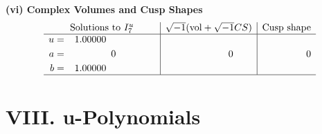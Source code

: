 \documentclass[1p]{elsarticle_modified}
\theoremstyle{definition}
\newcommand{\I}{\sqrt{-1}}
\begin{document}
\newpage\flushleft \textbf{(vi) Complex Volumes and Cusp Shapes}
$$\begin{array}{c|c|c}  
\text{Solutions to }I^u_{7}& \I (\text{vol} + \sqrt{-1}CS) & \text{Cusp shape}\\
 \hline 
\begin{aligned}
u &= \phantom{-}1.00000\phantom{ +0.000000I} \\
a &= \phantom{-0.000000 } 0 \\
b &= \phantom{-}1.00000\phantom{ +0.000000I}\end{aligned}
 & \phantom{-0.000000 } 0 & \phantom{-0.000000 } 0\\
 \hline 
 \end{array}$$\newpage
\newpage\renewcommand{\arraystretch}{1}
\centering \section*{ VIII. u-Polynomials}
\end{document}
